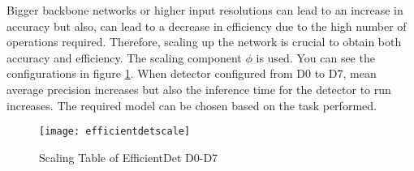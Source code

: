 \documentclass{article}
\begin{document}
Bigger backbone networks or higher input resolutions can lead to an increase 
in accuracy but also, can lead to a decrease in efficiency due to the high 
number of operations required. Therefore, scaling up the network is crucial 
to obtain both accuracy and efficiency. The scaling component $\phi$ is used. 
You can see the configurations in figure \ref{fig:efficientdetscale1}. 
When detector configured from D0 to D7, mean average precision increases but 
also the inference time for the detector to run increases. The required model 
can be chosen based on the task performed. 

\begin{figure}
    \centering
    \texttt{[image: efficientdetscale]}
    \caption{Scaling Table of EfficientDet D0-D7}
    \label{fig:efficientdetscale1}
\end{figure}
\end{document}
